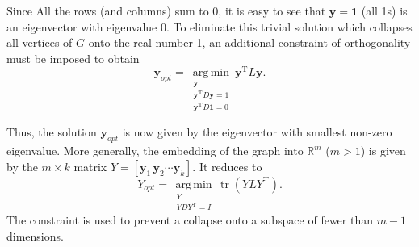 Since All the rows (and columns) sum to 0, it is easy to see that $\mathbf{y}=\mathbf{1}$ (all 1s) is an eigenvector with eigenvalue 0. To eliminate this trivial solution which collapses all vertices of $G$ onto the real number 1, an additional constraint of orthogonality must be imposed to obtain
\begin{equation}
	\mathbf{y}_{opt}=\operatorname*{arg\,min}\limits_{\substack{\mathbf{y}\\\mathbf{y}^{\operatorname{T}}D\mathbf{y}=1\\\mathbf{y}^{\operatorname{T}}D\mathbf{1}=0}} \mathbf{y}^{\operatorname{T}}L\mathbf{y}.
\end{equation}

Thus, the solution $\mathbf{y}_{opt}$ is now given by the eigenvector with smallest non-zero eigenvalue. More generally, the embedding of the graph into $\mathbb{R}^m $ ($m>1$) is given by the $m\times k$ matrix $Y=\left[\mathbf{y}_1\,\mathbf{y}_2\cdots \mathbf{y}_k\right]$. It reduces to
\begin{equation}
	Y_{opt}=\operatorname*{arg\,min}\limits_{\substack{Y\\YDY^{\operatorname{T}}=I}} \operatorname{tr}{\left(YLY^{\operatorname{T}}\right)}.
\end{equation} 
The constraint is used to prevent a collapse onto a subspace of fewer than $m-1$ dimensions.